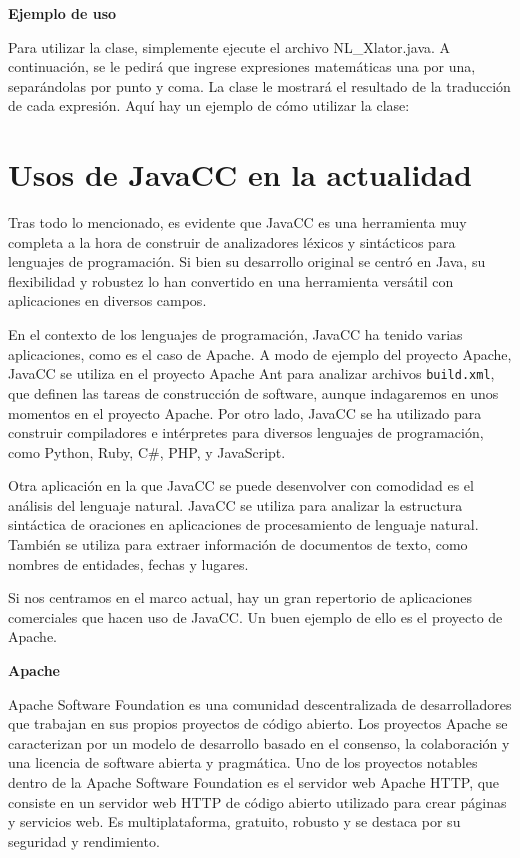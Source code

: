 \phantom{text}

\noindent \textbf{Ejemplo de uso}

\phantom{text}

\noindent Para utilizar la clase, simplemente ejecute el archivo NL\_Xlator.java. A continuación, se le pedirá que ingrese expresiones matemáticas una por una, separándolas por punto y coma. La clase le mostrará el resultado de la traducción de cada expresión.
Aquí hay un ejemplo de cómo utilizar la clase:

\section{Usos de JavaCC en la actualidad}

\noindent Tras todo lo mencionado, es evidente que JavaCC es una herramienta muy completa a la hora de construir de analizadores léxicos y sintácticos para lenguajes de programación. Si bien su desarrollo original se centró en Java, su flexibilidad y robustez lo han convertido en una herramienta versátil con aplicaciones en diversos campos.

En el contexto de los lenguajes de programación, JavaCC ha tenido varias aplicaciones, como es el caso de Apache. A modo de ejemplo del proyecto Apache, JavaCC se utiliza en el proyecto Apache Ant para analizar archivos  \lstinline|build.xml|, que definen las tareas de construcción de software\cite{apache}, aunque indagaremos en unos momentos en el proyecto Apache. Por otro lado, JavaCC se ha utilizado para construir compiladores e intérpretes para diversos lenguajes de programación, como Python, Ruby, C\#, PHP, y JavaScript\cite{javaccc++preprocessor}.

Otra aplicación en la que JavaCC se puede desenvolver con comodidad es el análisis del lenguaje natural. JavaCC se utiliza para analizar la estructura sintáctica de oraciones en aplicaciones de procesamiento de lenguaje natural\cite{languageprocessing}. También se utiliza para extraer información de documentos de texto, como nombres de entidades, fechas y lugares.

Si nos centramos en el marco actual, hay un gran repertorio de aplicaciones comerciales que hacen uso de JavaCC. Un buen ejemplo de ello es el proyecto de Apache.

\phantom{text}

\noindent \textbf{Apache}

\phantom{text}

\noindent Apache Software Foundation es una comunidad descentralizada de desarrolladores que trabajan en sus propios proyectos de código abierto. Los proyectos Apache se caracterizan por un modelo de desarrollo basado en el consenso, la colaboración y una licencia de software abierta y pragmática\cite{apachepaginaoficial}. Uno de los proyectos notables dentro de la Apache Software Foundation es el servidor web Apache HTTP, que consiste en un servidor web HTTP de código abierto utilizado para crear páginas y servicios web. Es multiplataforma, gratuito, robusto y se destaca por su seguridad y rendimiento\cite{apachehttp}.

